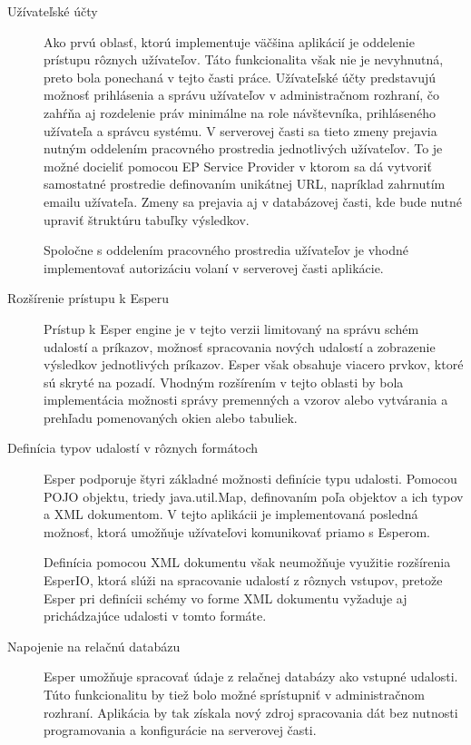 	\begin{description}
		\item[Užívateľské účty] 
		Ako prvú oblasť, ktorú implementuje väčšina aplikácií je oddelenie prístupu rôznych užívateľov. Táto funkcionalita však nie je nevyhnutná, preto bola ponechaná v tejto časti práce.
		Užívateľské účty predstavujú možnosť prihlásenia a správu užívateľov v administračnom rozhraní, čo zahŕňa aj rozdelenie práv minimálne na role návštevníka, prihláseného užívateľa a správcu systému.
		V serverovej časti sa tieto zmeny prejavia nutným oddelením pracovného prostredia jednotlivých užívateľov. To je možné docieliť pomocou EP Service Provider v ktorom sa dá vytvoriť samostatné prostredie definovaním unikátnej URL, napríklad zahrnutím emailu užívateľa.
		Zmeny sa prejavia aj v databázovej časti, kde bude nutné upraviť štruktúru tabuľky výsledkov.
		
		Spoločne s oddelením pracovného prostredia užívateľov je vhodné implementovať autorizáciu volaní v serverovej časti aplikácie.

		\item[Rozšírenie prístupu k Esperu] 
		Prístup k Esper engine je v tejto verzii limitovaný na správu schém udalostí a príkazov, možnosť spracovania nových udalostí a zobrazenie výsledkov jednotlivých príkazov.
		Esper však obsahuje viacero prvkov, ktoré sú skryté na pozadí. Vhodným rozšírením v tejto oblasti by bola implementácia možnosti správy premenných a vzorov alebo vytvárania a prehľadu pomenovaných okien alebo tabuliek.

		\item[Definícia typov udalostí v rôznych formátoch]
		Esper podporuje štyri základné možnosti definície typu udalosti. Pomocou POJO objektu, triedy java.util.Map, definovaním poľa objektov a ich typov a XML dokumentom. V tejto aplikácii je implementovaná posledná možnosť, ktorá umožňuje užívateľovi komunikovať priamo s Esperom.
		
		Definícia pomocou XML dokumentu však neumožňuje využitie rozšírenia EsperIO, ktorá slúži na spracovanie udalostí z rôznych vstupov, pretože Esper pri definícii schémy vo forme XML dokumentu vyžaduje aj prichádzajúce udalosti v tomto formáte.
		
		\item[Napojenie na relačnú databázu] 
		Esper umožňuje spracovať údaje z relačnej databázy ako vstupné udalosti. Túto funkcionalitu by tiež bolo možné sprístupniť v administračnom rozhraní. Aplikácia by tak získala nový zdroj spracovania dát bez nutnosti programovania a konfigurácie na serverovej časti.
		

\end{description}
